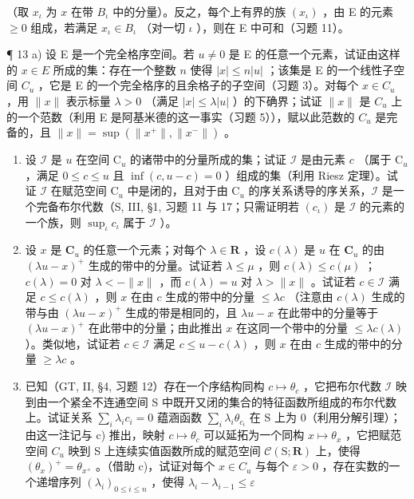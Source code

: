 （取 \(x_{\iota}\) 为 \(x\) 在带 \(B_{\iota}\) 中的分量）。反之，每个上有界的族 \((x_{\iota})\) ，由 E 的元素 \(\geqslant 0\) 组成，若满足 \(x_{\iota} \in B_{\iota}\) （对一切 \(\iota\) ），则在 E 中可和（习题 11）。

¶ 13 a) 设 E 是一个完全格序空间。若 \(u \neq 0\) 是 E 的任意一个元素，试证由这样的 \(x \in E\) 所成的集：存在一个整数 \(n\) 使得 \(|x| \leqslant n|u|\) ；该集是 E 的一个线性子空间 \(C_u\) ，它是 E 的一个完全格序的且余格子的子空间（习题 3）。对每个 \(x \in C_u\) ，用 \(\|x\|\) 表示标量 \(\lambda > 0\) （满足 \(|x| \leqslant \lambda |u|\) ）的下确界；试证 \(\|x\|\) 是 \(C_u\) 上的一个范数（利用 E 是阿基米德的这一事实（习题 5）），赋以此范数的 \(C_u\) 是完备的，且 \(\|x\| = \sup(\|x^+\|, \|x^-\|)\) 。

\begin{enumerate}
\def\labelenumi{\alph{enumi})}
\setcounter{enumi}{1}
\item
  设 \(\mathcal{I}\) 是 \(u\) 在空间 \(\mathrm{C}_u\) 的诸带中的分量所成的集；试证 \(\mathcal{I}\) 是由元素 \(c\) （属于 \(\mathrm{C}_u\) ，满足 \(0 \leqslant c \leqslant u\) 且 \(\inf(c, u - c) = 0\) ）组成的集（利用 Riesz 定理）。试证 \(\mathcal{I}\) 在赋范空间 \(\mathrm{C}_u\) 中是闭的，且对于由 \(\mathrm{C}_u\) 的序关系诱导的序关系，\(\mathcal{I}\) 是一个完备布尔代数（S, III, §1, 习题 11 与 17；只需证明若 \((c_\iota)\) 是 \(\mathcal{I}\) 的元素的一个族，则 \(\sup_{\iota} c_\iota\) 属于 \(\mathcal{I}\) ）。
\item
  设 \(x\) 是 \(\mathbf{C}_u\) 的任意一个元素；对每个 \(\lambda \in \mathbf{R}\) ，设 \(c(\lambda)\) 是 \(u\) 在 \(\mathbf{C}_u\) 的由 \((\lambda u - x)^+\) 生成的带中的分量。试证若 \(\lambda \leqslant \mu\) ，则 \(c(\lambda) \leqslant c(\mu)\) ；\(c(\lambda) = 0\) 对 \(\lambda < -\|x\|\) ，而 \(c(\lambda) = u\) 对 \(\lambda > \|x\|\) 。试证若 \(c \in \mathcal{I}\) 满足 \(c \leqslant c(\lambda)\) ，则 \(x\) 在由 \(c\) 生成的带中的分量 \(\leqslant \lambda c\) （注意由 \(c(\lambda)\) 生成的带与由 \((\lambda u - x)^+\) 生成的带是相同的，且 \(\lambda u - x\) 在此带中的分量等于 \((\lambda u - x)^+\) 在此带中的分量；由此推出 \(x\) 在这同一个带中的分量 \(\leqslant \lambda c(\lambda)\) ）。类似地，试证若 \(c \in \mathcal{I}\) 满足 \(c \leqslant u - c(\lambda)\) ，则 \(x\) 在由 \(c\) 生成的带中的分量 \(\geqslant \lambda c\) 。
\item
  已知（GT, II, §4, 习题 12）存在一个序结构同构 \(c \mapsto \theta_c\) ，它把布尔代数 \(\mathcal{I}\) 映到由一个紧全不连通空间 S 中既开又闭的集合的特征函数所组成的布尔代数上。试证关系 \(\sum_{i} \lambda_i c_i = 0\) 蕴涵函数 \(\sum_{i} \lambda_i \theta_{c_i}\) 在 S 上为 0（利用分解引理）；由这一注记与 c) 推出，映射 \(c \mapsto \theta_{c}\) 可以延拓为一个同构 \(x \mapsto \theta_{x}\) ，它把赋范空间 \(C_{u}\) 映到 S 上连续实值函数所成的赋范空间 \(\mathcal{C}(\mathrm{S};\mathbf{R})\) 上，使得 \((\theta_{x})^{+} = \theta_{x^{+}}\) 。（借助 c)，试证对每个 \(x \in C_{u}\) 与每个 \(\varepsilon > 0\) ，存在实数的一个递增序列 \((\lambda_{i})_{0 \leqslant i \leqslant n}\) ，使得 \(\lambda_{i} - \lambda_{i-1} \leqslant \varepsilon\)
\end{enumerate}

